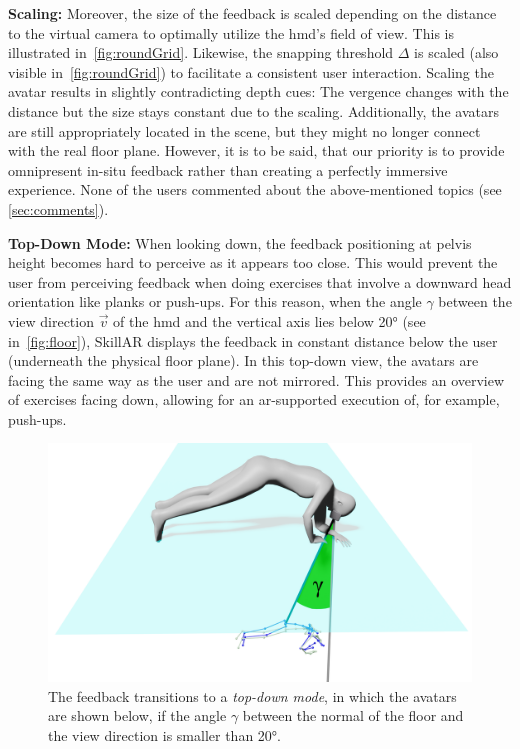 \textbf{Scaling:}
Moreover, the size of the feedback is scaled depending on the distance to the virtual camera to optimally utilize the \acrshort{hmd}'s field of view.  This is illustrated in~\autoref{fig:roundGrid}. Likewise, the snapping threshold $\Delta$ is scaled (also visible in~\autoref{fig:roundGrid}) to facilitate a consistent user interaction. Scaling the avatar results in slightly contradicting depth cues: The vergence changes with the distance but the size stays constant due to the scaling. Additionally, the avatars are still appropriately located in the scene, but they might no longer connect with the real floor plane. However, it is to be said, that our priority is to provide omnipresent in-situ feedback rather than creating a perfectly immersive experience. None of the users commented about the above-mentioned topics (see \autoref{sec:comments}).

\textbf{Top-Down Mode:}
When looking down, the feedback positioning at pelvis height becomes hard to perceive as it appears too close. This would prevent the user from perceiving feedback when doing exercises that involve a downward head orientation like planks or push-ups. For this reason, when the angle $\gamma$ between the view direction $\vec{v}$ of the \acrshort{hmd} and the vertical axis lies below 20° (see in~\autoref{fig:floor}), SkillAR displays the feedback in constant distance below the user (underneath the physical floor plane). In this top-down view, the avatars are facing the same way as the user and are not mirrored. This provides an overview of exercises facing down, allowing for an \acrshort{ar}-supported execution of, for example, push-ups.

\begin{figure}[h!]
	\centering
	\includegraphics[width=0.6\linewidth]{pictures/floorPos.png}
	\caption{The feedback transitions to a \emph{top-down mode}, in which the avatars are shown below, if the angle $\gamma$ between the normal of the floor and the view direction is smaller than 20°. \label{fig:floor}}
\end{figure}

